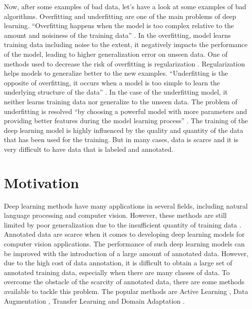 Now, after some examples of bad data, let's have a look at some examples of bad algorithms. Overfitting and underfitting are one of the main problems of deep learning. ``Overfitting happens when the model is too complex relative to the amount and noisiness of the training data'' \cite{10.5555/3153997}. In the overfitting, model learns training data including noise to the extent, it negatively impacts the performance of the model, leading to higher generalization error on unseen data. One of methods used to decrease the risk of overfitting is regularization \cite{kukacka2017regularization}. Regularization helps models to generalize better to the new examples. ``Underfitting is the opposite of overfitting, it occurs when a model is too simple to learn the underlying structure of the data'' \cite{10.5555/3153997}. In the case of the underfitting model, it neither learns training data nor generalize to the unseen data. The problem of underfitting is resolved ``by choosing a powerful model with more parameters and providing better features during the model learning process'' \cite{10.5555/3153997}. The training of the deep learning model is highly influenced by the quality and quantity of the data that has been used for the training. But in many cases, data is scarce and it is very difficult to have data that is labeled and annotated.





\section{Motivation}\label{motivation}

Deep learning methods have many applications in several fields, including natural language processing and computer vision. However, these methods are still limited by poor generalization due to the insufficient quantity of training data \cite{8978087}. Annotated data are scarce when it comes to developing deep learning models for computer vision applications. The performance of such deep learning models can be improved with the introduction of a large amount of annotated data. However, due to the high cost of data annotation, it is difficult to obtain a large set of annotated training data, especially when there are many classes of data. To overcome the obstacle of the scarcity of annotated data, there are some methods available to tackle this problem. The popular methods are Active Learning \cite{hemmer2020deal}, Data Augmentation \cite{Shorten.2019}, Transfer Learning \cite{zhuang2020comprehensive} and Domain Adaptation \cite{redko2020survey}. 

